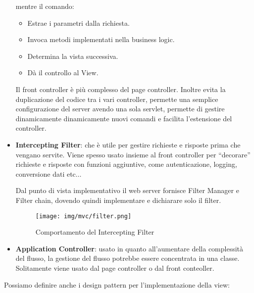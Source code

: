 \begin{itemize}
    mentre il comando:
    \begin{itemize}
        \item Estrae i parametri dalla richiesta.
        \item Invoca metodi implementati nella business logic.
        \item Determina la vista successiva.
        \item Dà il controllo al View.
    \end{itemize}
    Il front controller è più complesso del page controller. Inoltre evita la duplicazione del codice tra i vari controller, permette una semplice configurazione del server avendo una sola servlet, permette di gestire dinamicamente dinamicamente nuovi comandi e facilita l'estensione del controller.
    \item \textbf{Intercepting Filter}: che è utile per gestire richieste e risposte prima che vengano servite. Viene spesso usato insieme al front controller per “decorare” richieste e risposte con funzioni aggiuntive, come autenticazione, logging, conversione dati etc$\dots$
    
    Dal punto di vista implementativo il web server fornisce Filter Manager e Filter chain, dovendo quindi implementare e dichiarare solo il filter.
    \begin{figure}[!ht]
        \centering
        \texttt{[image: img/mvc/filter.png]}
        \caption{Comportamento del Intercepting Filter}
    \end{figure}
    \item \textbf{Application Controller}: usato in quanto all'aumentare della complessità del flusso, la gestione del flusso potrebbe essere concentrata in una classe. Solitamente viene usato dal page controller o dal front conteoller.
\end{itemize}
Possiamo definire anche i design pattern per l'implementazione della view:
